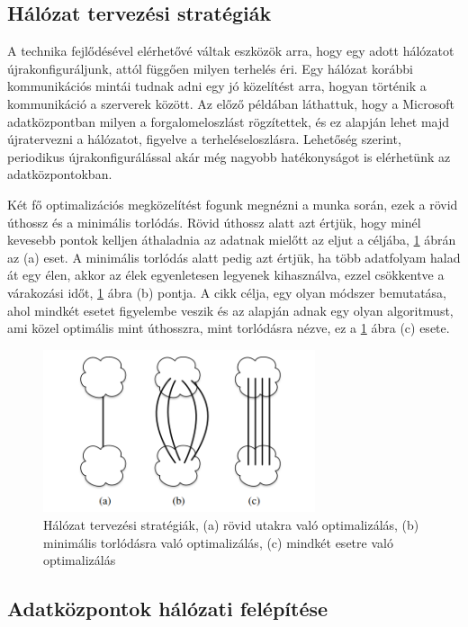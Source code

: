 \documentclass[12pt]{report}
\begin{document}
\subsection{Hálózat tervezési stratégiák}

A technika fejlődésével elérhetővé váltak eszközök arra, hogy egy adott hálózatot újrakonfiguráljunk, attól függően milyen terhelés éri.
Egy hálózat korábbi kommunikációs mintái tudnak adni egy jó közelítést arra, hogyan történik a kommunikáció a szerverek között.
Az előző példában láthattuk, hogy a Microsoft adatközpontban milyen a forgalomeloszlást rögzítettek, 
és ez alapján lehet majd újratervezni a hálózatot, figyelve a terheléseloszlásra.
Lehetőség szerint, periodikus újrakonfigurálással akár még nagyobb hatékonyságot is elérhetünk az adatközpontokban.

Két fő optimalizációs megközelítést fogunk megnézni a munka során, ezek a rövid úthossz és a minimális torlódás.
Rövid úthossz alatt azt értjük, hogy minél kevesebb pontok kelljen áthaladnia az adatnak mielőtt az eljut a céljába, \ref{network_strategies} ábrán az (a) eset.
A minimális torlódás alatt pedig azt értjük, ha több adatfolyam halad át egy élen, akkor az élek egyenletesen legyenek kihasználva, ezzel csökkentve a várakozási időt, \ref{network_strategies} ábra (b) pontja.
A cikk célja, egy olyan módszer bemutatása, ahol mindkét esetet figyelembe veszik és az alapján adnak egy olyan algoritmust, ami közel optimális mint úthosszra, mint torlódásra nézve, ez a \ref{network_strategies} ábra (c) esete.


\begin{figure}[h]
	\centering
	\includegraphics[width=8cm]{pictures/optimalshemes.png}
	\caption{Hálózat tervezési stratégiák, (a) rövid utakra való optimalizálás, (b) minimális torlódásra való optimalizálás, (c) mindkét esetre való optimalizálás}
	\label{network_strategies}
\end{figure}

\subsection{Adatközpontok hálózati felépítése}
\end{document}

